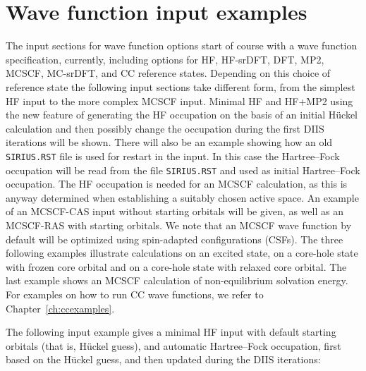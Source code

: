 \section{\label{examples} Wave function input examples}

The input sections for wave function options start of course
with a wave function specification, currently,
including options for HF, HF-srDFT, DFT, MP2, MCSCF, MC-srDFT, and CC reference states.
Depending on this choice of reference state the following input
sections take different form, from the simplest HF input to the
more complex MCSCF input. Minimal HF and HF+MP2
using the new feature of generating the HF
occupation on the basis of an initial H\"{u}ckel
calculation and then possibly change the
occupation during the first DIIS iterations will be
shown. There will also be an example showing how an old
\verb|SIRIUS.RST| file is used for restart in the
input. 
In this case the Hartree--Fock occupation will be read from
the file \verb|SIRIUS.RST| and used as initial Hartree--Fock
occupation.
The HF occupation is
needed for an MCSCF calculation, as this is anyway
determined when establishing a suitably chosen active
space. An example of an
MCSCF-CAS input without starting
orbitals will be given, as well as an
MCSCF-RAS with starting orbitals. We note that an
MCSCF wave function by default will be optimized using
spin-adapted configurations
(CSFs).
The three
following examples illustrate calculations on an excited
state, on a core-hole state
with frozen core orbital and on a core-hole
state with relaxed core orbital. The last
example shows an MCSCF calculation of non-equilibrium solvation
energy. For examples on how to run CC
wave functions, we refer to Chapter~\ref{ch:ccexamples}.

\bigskip

The following input example gives a minimal
HF input with default
starting  orbitals (that is, H\"{u}ckel guess), and automatic Hartree--Fock
occupation, first based on the H\"{u}ckel guess, and
then updated during the DIIS iterations:

